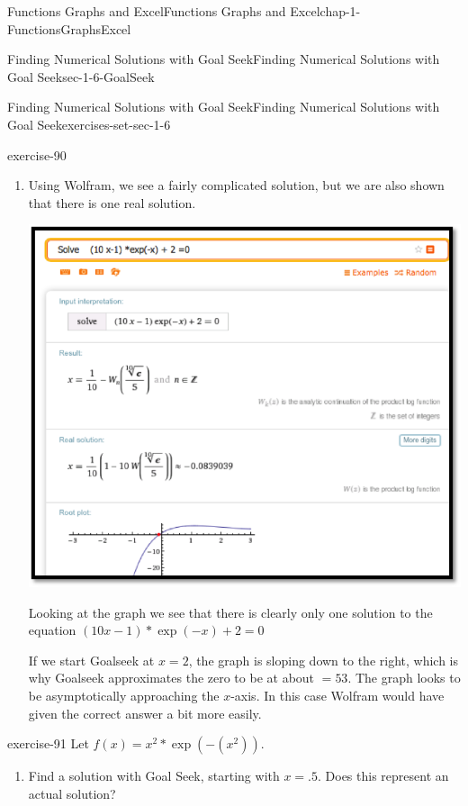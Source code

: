 \documentclass[oneside,10pt,]{book}
\numberwithin{equation}{section}
\begin{document}
\begin{chapterptx}{Functions Graphs and Excel}{}{Functions Graphs and Excel}{}{}{chap-1-FunctionsGraphsExcel}
\begin{sectionptx}{Finding Numerical Solutions with Goal Seek}{}{Finding Numerical Solutions with Goal Seek}{}{}{sec-1-6-GoalSeek}
\begin{exercises-subsection-numberless}{Finding Numerical Solutions with Goal Seek}{}{Finding Numerical Solutions with Goal Seek}{}{}{exercises-set-sec-1-6}
\begin{divisionexercise}{15}{}{}{exercise-90}
\begin{enumerate}[label=(\alph*)]
\item\hypertarget{li-158}{}\hypertarget{p-542}{}%
Using Wolfram, we see a fairly complicated solution, but we are also shown that there is one real solution.%
\begin{sidebyside}{1}{0.1}{0.1}{0}%
\begin{sbspanel}{0.8}%
\includegraphics[width=1\linewidth]{images/sec1-6-sol15b.png}
\end{sbspanel}%
\end{sidebyside}%
\par
\hypertarget{p-543}{}%
Looking at the graph we see that there is clearly only one solution to the equation \((10 x-1) *\exp(-x) + 2 = 0\)%
\par
\hypertarget{p-544}{}%
If we start Goalseek at \(x = 2\), the graph is sloping down to the right, which is why Goalseek approximates the zero to be at about \(= 53\). The graph looks to be asymptotically approaching the \(x\)-axis. In this case Wolfram would have given the correct answer a bit more easily.%
\end{enumerate}
\end{divisionexercise}%
\begin{divisionexercise}{16}{}{}{exercise-91}%
\hypertarget{p-545}{}%
Let \(f(x) = x^2*\exp(-(x^2))\).%
\leavevmode%
\begin{enumerate}[label=(\alph*)]
\item\hypertarget{li-159}{}\hypertarget{p-546}{}%
Find a solution with Goal Seek, starting with \(x=.5\).  Does this represent an actual solution?%

\end{enumerate}
\end{divisionexercise}
\end{exercises-subsection-numberless}
\end{sectionptx}
\end{chapterptx}
\end{document}
